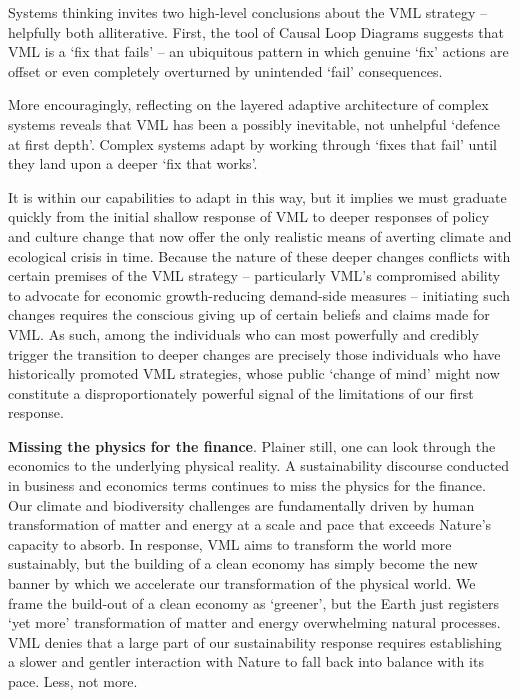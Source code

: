 \documentclass[
]{book}
\begin{document}
Systems thinking invites two high-level conclusions about the VML strategy -- helpfully both
alliterative. First, the tool of Causal Loop Diagrams suggests that VML is a `fix that fails' -- an
ubiquitous pattern in which genuine `fix' actions are offset or even completely overturned by
unintended `fail' consequences.

More encouragingly, reflecting on the layered adaptive architecture of complex systems reveals that
VML has been a possibly inevitable, not unhelpful `defence at first depth'. Complex systems adapt
by working through `fixes that fail' until they land upon a deeper `fix that works'.

It is within our
capabilities to adapt in this way, but it implies we must graduate quickly from the initial shallow
response of VML to deeper responses of policy and culture change that now offer the only realistic
means of averting climate and ecological crisis in time. Because the nature of these deeper changes
conflicts with certain premises of the VML strategy -- particularly VML's compromised ability to
advocate for economic growth-reducing demand-side measures -- initiating such changes requires
the conscious giving up of certain beliefs and claims made for VML. As such, among the individuals
who can most powerfully and credibly trigger the transition to deeper changes are precisely those
individuals who have historically promoted VML strategies, whose public `change of mind' might
now constitute a disproportionately powerful signal of the limitations of our first response.

\textbf{Missing the physics for the finance}.
Plainer still, one can look through the economics to the underlying physical reality. A sustainability
discourse conducted in business and economics terms continues to miss the physics for the finance.
Our climate and biodiversity challenges are fundamentally driven by human transformation of matter
and energy at a scale and pace that exceeds Nature's capacity to absorb. In response, VML aims to
transform the world more sustainably, but the building of a clean economy has simply become the
new banner by which we accelerate our transformation of the physical world. We frame the build-out
of a clean economy as `greener', but the Earth just registers `yet more' transformation of matter and
energy overwhelming natural processes. VML denies that a large part of our sustainability response
requires establishing a slower and gentler interaction with Nature to fall back into balance with its
pace. Less, not more.
\end{document}
